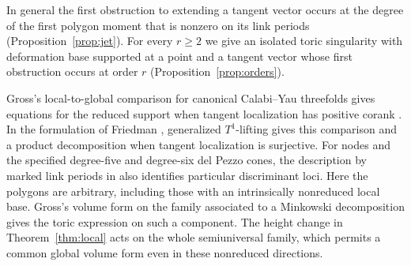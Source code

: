 \documentclass[11pt]{amsart}
\theoremstyle{definition}
\theoremstyle{remark}
\begin{document}
In general the first obstruction to extending a tangent vector occurs
at the degree of the first polygon moment that is nonzero on its link
periods (Proposition~\ref{prop:jet}). For every $r\geq 2$ we give an
isolated toric singularity with deformation base supported at a point
and a tangent vector whose first obstruction occurs at order $r$
(Proposition~\ref{prop:orders}).

Gross's local-to-global comparison for canonical Calabi--Yau threefolds
gives equations for the reduced support when tangent localization has
positive corank \cite[Theorems~1.16 and~2.2]{Gross}. In the formulation
of Friedman \cite[Theorem~3.8 and Corollary~3.11]{Fried}, generalized
$T^1$-lifting gives this comparison and a product decomposition when
tangent localization is surjective. For nodes and the
specified degree-five and degree-six del Pezzo cones, the description
by marked link periods in \cite[Theorem~1.1]{Wue} also identifies
particular discriminant loci. Here the polygons are arbitrary,
including those with an intrinsically nonreduced local base. Gross's
volume form on the family associated to a Minkowski decomposition
\cite[Proposition~3.2]{GrossSL} gives the toric expression on such a
component. The height change in Theorem~\ref{thm:local} acts on the
whole semiuniversal family, which permits a common global volume form
even in these nonreduced directions.








\end{document}
